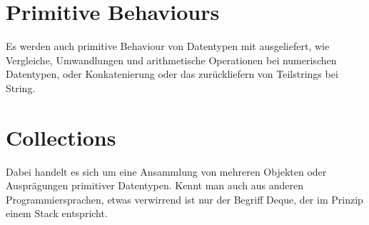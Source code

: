 \section{Primitive Behaviours}
Es werden auch primitive Behaviour von Datentypen mit ausgeliefert, wie Vergleiche, Umwandlungen und arithmetische Operationen bei numerischen Datentypen, oder Konkatenierung oder das zurückliefern von Teilstrings bei String.

\section{Collections}
Dabei handelt es sich um eine Ansammlung von mehreren Objekten oder Ausprägungen primitiver Datentypen. Kennt man auch aus anderen Programmiersprachen, etwas verwirrend ist nur der Begriff Deque, der im Prinzip einem Stack entspricht.
